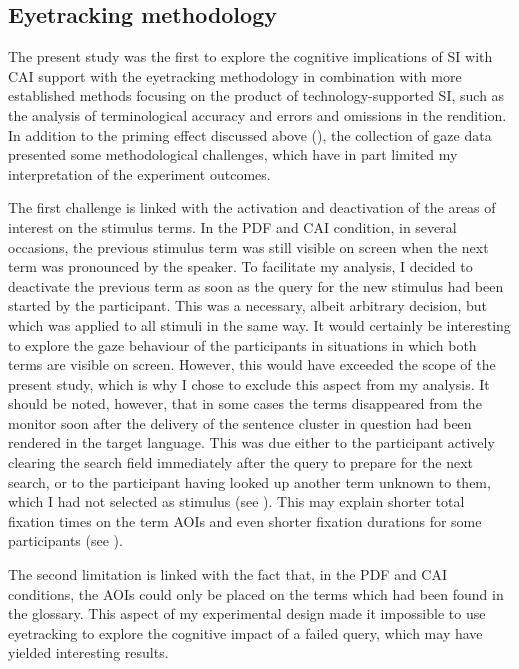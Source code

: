 \subsection{Eyetracking methodology} \label{limit_eyetracking}
The present study was the first to explore the cognitive implications of SI with CAI support with the eyetracking methodology in combination with more established methods focusing on the product of technology-supported SI, such as the analysis of terminological accuracy and errors and omissions in the rendition. In addition to the priming effect discussed above (), the collection of gaze data presented some methodological challenges, which have in part limited my interpretation of the experiment outcomes.

The first challenge is linked with the activation and deactivation of the areas of interest on the stimulus terms. In the PDF and CAI condition, in several occasions, the previous stimulus term was still visible on screen when the next term was pronounced by the speaker. To facilitate my analysis, I decided to deactivate the previous term as soon as the query for the new stimulus had been started by the participant. This was a necessary, albeit arbitrary decision, but which was applied to all stimuli in the same way. It would certainly be interesting to explore the gaze behaviour of the participants in situations in which both terms are visible on screen. However, this would have exceeded the scope of the present study, which is why I chose to exclude this aspect from my analysis. It should be noted, however, that in some cases the terms disappeared from the monitor soon after the delivery of the sentence cluster in question had been rendered in the target language. This was due either to the participant actively clearing the search field immediately after the query to prepare for the next search, or to the participant having looked up another term unknown to them, which I had not selected as stimulus (see ). This may explain shorter total fixation times on the term AOIs and even shorter fixation durations for some participants (see ).

The second limitation is linked with the fact that, in the PDF and CAI conditions, the AOIs could only be placed on the terms which had been found in the glossary. This aspect of my experimental design made it impossible to use eyetracking to explore the cognitive impact of a failed query, which may have yielded interesting results.

